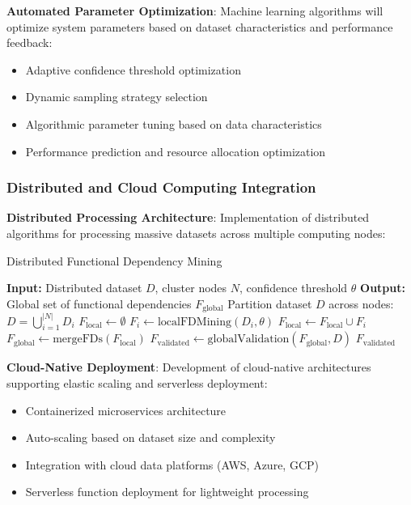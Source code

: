 \documentclass[acmsmall]{acmart}
\begin{document}
\textbf{Automated Parameter Optimization}: Machine learning algorithms will optimize system parameters based on dataset characteristics and performance feedback:
\begin{itemize}
\item Adaptive confidence threshold optimization
\item Dynamic sampling strategy selection
\item Algorithmic parameter tuning based on data characteristics
\item Performance prediction and resource allocation optimization
\end{itemize}

\subsubsection{Distributed and Cloud Computing Integration}

\textbf{Distributed Processing Architecture}: Implementation of distributed algorithms for processing massive datasets across multiple computing nodes:

\begin{algorithm}[h]
\caption{Distributed Functional Dependency Mining}
\label{alg:distributed_fd_mining}
\begin{algorithmic}[1]
\STATE \textbf{Input:} Distributed dataset $D$, cluster nodes $N$, confidence threshold $\theta$
\STATE \textbf{Output:} Global set of functional dependencies $F_{\text{global}}$
\STATE Partition dataset $D$ across nodes: $D = \bigcup_{i=1}^{|N|} D_i$
\STATE $F_{\text{local}} \leftarrow \emptyset$
    \STATE $F_i \leftarrow \text{localFDMining}(D_i, \theta)$
    \STATE $F_{\text{local}} \leftarrow F_{\text{local}} \cup F_i$
\ENDFOR
\STATE $F_{\text{global}} \leftarrow \text{mergeFDs}(F_{\text{local}})$
\STATE $F_{\text{validated}} \leftarrow \text{globalValidation}(F_{\text{global}}, D)$
\RETURN $F_{\text{validated}}$
\end{algorithmic}
\end{algorithm}

\textbf{Cloud-Native Deployment}: Development of cloud-native architectures supporting elastic scaling and serverless deployment:
\begin{itemize}
\item Containerized microservices architecture
\item Auto-scaling based on dataset size and complexity
\item Integration with cloud data platforms (AWS, Azure, GCP)
\item Serverless function deployment for lightweight processing
\end{itemize}
\end{document}

